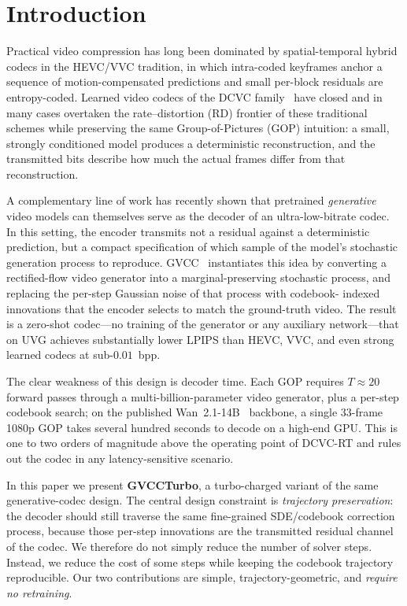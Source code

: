 \section{Introduction}
\label{sec:intro}

Practical video compression has long been dominated by spatial-temporal
hybrid codecs in the HEVC/VVC tradition, in which intra-coded keyframes
anchor a sequence of motion-compensated predictions and small per-block
residuals are entropy-coded. Learned video codecs of the
DCVC family~\cite{li2024neural,jia2025dcvcrt} have closed and in many cases
overtaken the rate--distortion (RD) frontier of these traditional schemes
while preserving the same Group-of-Pictures (GOP) intuition: a small,
strongly conditioned model produces a deterministic reconstruction, and
the transmitted bits describe how much the actual frames differ from that
reconstruction.

A complementary line of work has recently shown that pretrained
\emph{generative} video models can themselves serve as the decoder of an
ultra-low-bitrate codec. In this setting, the encoder transmits not a
residual against a deterministic prediction, but a compact specification of
which sample of the model's stochastic generation process to reproduce.
GVCC~\cite{zeng2026gvcc} instantiates this idea by converting a
rectified-flow video generator into a marginal-preserving stochastic process,
and replacing the per-step Gaussian noise of that process with codebook-
indexed innovations that the encoder selects to match the ground-truth video.
The result is a zero-shot codec---no training of the generator or any
auxiliary network---that on UVG achieves substantially lower LPIPS than
HEVC, VVC, and even strong learned codecs at sub-$0.01$~bpp.

The clear weakness of this design is decoder time. Each GOP requires
$T \approx 20$ forward passes through a multi-billion-parameter video
generator, plus a per-step codebook search; on the published
Wan~2.1-14B~\cite{wan2025} backbone, a single $33$-frame 1080p GOP takes
several hundred seconds to decode on a high-end GPU. This is one to two
orders of magnitude above the operating point of DCVC-RT and rules out the
codec in any latency-sensitive scenario.

In this paper we present \textbf{GVCCTurbo}, a turbo-charged variant of the
same generative-codec design. The central design constraint is
\emph{trajectory preservation}: the decoder should still traverse the same
fine-grained SDE/codebook correction process, because those per-step
innovations are the transmitted residual channel of the codec. We therefore do
not simply reduce the number of solver steps. Instead, we reduce the cost of
some steps while keeping the codebook trajectory reproducible. Our two
contributions are simple, trajectory-geometric, and \emph{require no
retraining}.

